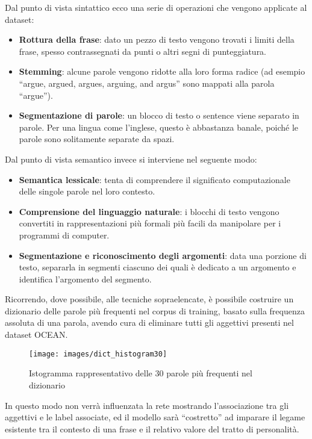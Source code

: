 Dal punto di vista sintattico ecco una serie di operazioni che vengono applicate al dataset:
\begin{itemize}
	\item \textbf{Rottura della frase}: dato un pezzo di testo vengono trovati i limiti della frase, spesso contrassegnati da punti o altri segni di punteggiatura.
	\item \textbf{Stemming}: alcune parole vengono ridotte alla loro forma radice (ad esempio ``argue, argued, argues, arguing, and argus'' sono mappati alla parola ``argue'').
	\item \textbf{Segmentazione di parole}: un blocco di testo o sentence viene separato in parole. Per una lingua come l'inglese, questo è abbastanza banale, poiché le parole sono solitamente separate da spazi. 
\end{itemize}
Dal punto di vista semantico invece si interviene nel seguente modo:
\begin{itemize}
	\item \textbf{Semantica lessicale}: tenta di comprendere il significato computazionale delle singole parole nel loro contesto.
	\item \textbf{Comprensione del linguaggio naturale}: i blocchi di testo vengono convertiti in rappresentazioni più formali più facili da manipolare per i programmi di computer. 
	\item \textbf{Segmentazione e riconoscimento degli argomenti}: data una porzione di testo, separarla in segmenti ciascuno dei quali è dedicato a un argomento e identifica l'argomento del segmento.
\end{itemize}
Ricorrendo, dove possibile, alle tecniche sopraelencate, è possibile costruire un dizionario delle  parole più frequenti nel corpus di training, basato sulla frequenza assoluta di una parola, avendo cura di eliminare tutti gli aggettivi presenti nel dataset OCEAN.

\begin{figure}[H]
	\centering
	{\texttt{[image: images/dict\_histogram30]}}
	\caption{Istogramma rappresentativo delle \num{30} parole più frequenti nel dizionario}
	\label{fig:Istrogramma del dizionario}
\end{figure}
In questo modo non verrà influenzata la rete mostrando l'associazione tra gli aggettivi e le label associate, ed il modello sarà ``costretto'' ad imparare il legame esistente tra il contesto di una frase e il relativo valore del tratto di personalità. 

